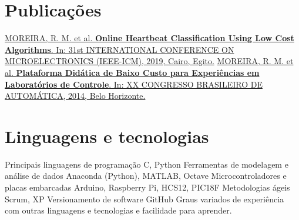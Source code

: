 \documentclass[]{cv-style}          %
\begin{document}
\section{Publicações}
\vspace{-0.3cm}
\begin{entrylist}
\entry
{}
{}
{\vspace{-0.4cm}}
{\href{https://doi.org/10.1109/ICM48031.2019.9021277}{MOREIRA, R. M. et al. \textbf{Online Heartbeat Classification Using Low Cost Algorithms}. In: 31st INTERNATIONAL CONFERENCE ON MICROELECTRONICS (IEEE-ICM), 2019, Cairo, Egito.}}
{}
\entry
{}
{}
{\vspace{-0.01cm}}
{\href{http://www.swge.inf.br/CBA2014/anais/PDF/1569927865.pdf}{MOREIRA, R. M. et al. \textbf{Plataforma Didática de Baixo Custo para Experiências em Laboratórios de Controle}. In: XX CONGRESSO BRASILEIRO DE AUTOMÁTICA, 2014, Belo Horizonte.}}
{}
\end{entrylist}
{\vspace{-0.4cm}}

\section{Linguagens e tecnologias}
\vspace{-0.3cm}
\begin{entrylist}
\entry
{}
{Principais linguagens de programação}
{C, Python}
{\vspace{-0.5cm}}
\entry
{}
{Ferramentas de modelagem e análise de dados}
{Anaconda (Python), MATLAB, Octave}
{\vspace{-0.5cm}}
\entry
{}
{Microcontroladores e placas embarcadas}
{Arduino, Raspberry Pi, HCS12, PIC18F}
{\vspace{-0.5cm}}
\entry
{}
{Metodologias ágeis}
{Scrum, XP}
{\vspace{-0.5cm}}
\entry
{}
{Versionamento de software}
{GitHub}
{\vspace{-0.5cm}}
\entry
{}
{Graus variados de experiência com outras linguagens e tecnologias e facilidade para aprender. }
{}
{\vspace{-4.0cm}}
\end{entrylist}
\end{document}
